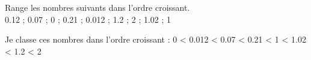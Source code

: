 \begin{questions}
	\question[1\half] Range les nombres suivants dans l'ordre croissant. \\
	\num{0.12} \hspace{0.2cm};\hspace{0.2cm} \num{0.07} \hspace{0.2cm};\hspace{0.2cm} \num{0} \hspace{0.2cm};\hspace{0.2cm} \num{0.21} \hspace{0.2cm};\hspace{0.2cm} \num{0.012} \hspace{0.2cm};\hspace{0.2cm} \num{1.2} \hspace{0.2cm};\hspace{0.2cm} 2 \hspace{0.2cm};\hspace{0.2cm}  \num{1.02} \hspace{0.2cm};\hspace{0.2cm} \num{1}
	\begin{solution}
		Je classe ces nombres dans l'ordre croissant :
		0 < \num{0.012} < \num{0.07} < \num{0.21} < \num{1} < \num{1.02} < \num{1.2} < \num{2} 
	\end{solution}
\end{questions}
